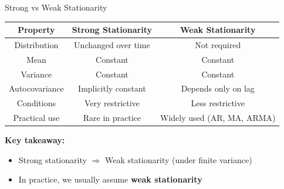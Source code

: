 \documentclass[aspectratio=169]{beamer}
\begin{document}
\begin{frame}{Strong vs Weak Stationarity}

\begin{center}
\begin{tabular}{|c|c|c|}
\hline
\textbf{Property} & \textbf{Strong Stationarity} & \textbf{Weak Stationarity} \\
\hline
Distribution & Unchanged over time & Not required \\
\hline
Mean & Constant & Constant \\
\hline
Variance & Constant & Constant \\
\hline
Autocovariance & Implicitly constant & Depends only on lag \\
\hline
Conditions & Very restrictive & Less restrictive \\
\hline
Practical use & Rare in practice & Widely used (AR, MA, ARMA) \\
\hline
\end{tabular}
\end{center}

\vspace{0.4cm}

\textbf{Key takeaway:}
\begin{itemize}
    \item Strong stationarity $\Rightarrow$ Weak stationarity (under finite variance)
    \item In practice, we usually assume \textbf{weak stationarity}
\end{itemize}

\end{frame}
\end{document}
